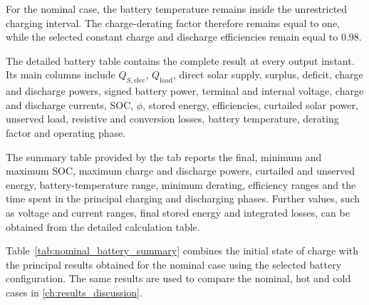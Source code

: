 For the nominal case, the battery temperature remains inside the unrestricted
charging interval. The charge-derating factor therefore remains equal to one,
while the selected constant charge and discharge efficiencies remain equal to
\(0.98\).

The detailed battery table contains the complete result at every output
instant. Its main columns include $Q_{S,\mathrm{elec}}$,
$Q_{\mathrm{load}}$, direct solar supply, surplus, deficit, charge and
discharge powers, signed battery power, terminal and internal voltage, charge
and discharge currents, SOC, $\phi$, stored energy, efficiencies, curtailed
solar power, unserved load, resistive and conversion losses, battery
temperature, derating factor and operating phase.

The summary table provided by the tab reports the final, minimum and maximum
SOC, maximum charge and discharge powers, curtailed and unserved energy,
battery-temperature range, minimum derating, efficiency ranges and the time
spent in the principal charging and discharging phases. Further values, such
as voltage and current ranges, final stored energy and integrated losses, can
be obtained from the detailed calculation table.

Table~\ref{tab:nominal_battery_summary} combines the initial state of charge
with the principal results obtained for the nominal case using the selected
battery configuration. The same results are used to compare the nominal, hot
and cold cases in \autoref{ch:results_discussion}.


\NominalBatterySummaryTable[0.82\textwidth]

\FloatBarrier
